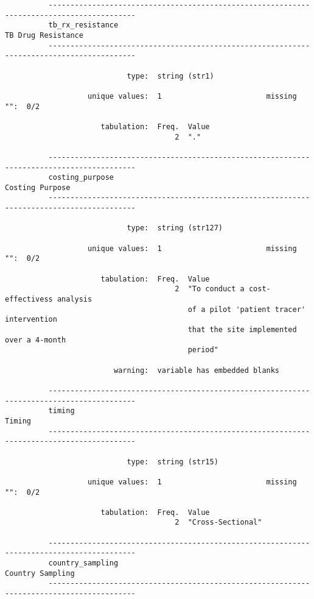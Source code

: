 \documentclass{article}
\begin{document}
\begin{verbatim}
          ------------------------------------------------------------------------------------------
          tb_rx_resistance                                                        TB Drug Resistance
          ------------------------------------------------------------------------------------------
          
                            type:  string (str1)
          
                   unique values:  1                        missing "":  0/2
          
                      tabulation:  Freq.  Value
                                       2  "."
          
          ------------------------------------------------------------------------------------------
          costing_purpose                                                            Costing Purpose
          ------------------------------------------------------------------------------------------
          
                            type:  string (str127)
          
                   unique values:  1                        missing "":  0/2
          
                      tabulation:  Freq.  Value
                                       2  "To conduct a cost-effectivess analysis
                                          of a pilot 'patient tracer' intervention
                                          that the site implemented over a 4-month
                                          period"
          
                         warning:  variable has embedded blanks
          
          ------------------------------------------------------------------------------------------
          timing                                                                              Timing
          ------------------------------------------------------------------------------------------
          
                            type:  string (str15)
          
                   unique values:  1                        missing "":  0/2
          
                      tabulation:  Freq.  Value
                                       2  "Cross-Sectional"
          
          ------------------------------------------------------------------------------------------
          country_sampling                                                          Country Sampling
          ------------------------------------------------------------------------------------------
          

\end{verbatim}
\end{document}
